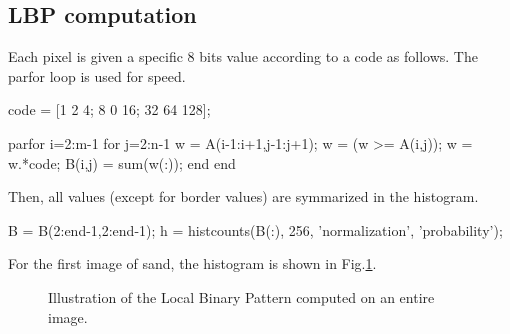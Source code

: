 \def\QRCODE{MASTER_mispa_TUT.IMG.lbp_matlabqrcode.png}
\def\QRPAGE{http://www.iptutorials.science/tree/master/MASTER_mispa/TUT.IMG.lbp/matlab}

\subsection{LBP computation}
Each pixel is given a specific 8 bits value according to a code as follows. The parfor loop is used for speed.

\begin{matlab}
code = [1 2 4; 8 0 16; 32 64 128];

parfor i=2:m-1
    for j=2:n-1
        w = A(i-1:i+1,j-1:j+1);
        w = (w >= A(i,j));
        w = w.*code;
        B(i,j) = sum(w(:));
    end
end
\end{matlab}

Then, all values (except for border values) are symmarized in the histogram.

\begin{matlab}
B = B(2:end-1,2:end-1);
h = histcounts(B(:), 256, 'normalization', 'probability');
\end{matlab}

For the first image of sand, the histogram is shown in Fig.\ref{fig:lbp:matlab:lbpsand1}.

\begin{figure}[htbp]
 \centering
 
 \hfill
 
 \caption{Illustration of the Local Binary Pattern computed on an entire image.}
 \label{fig:lbp:matlab:lbpsand1}
\end{figure}

